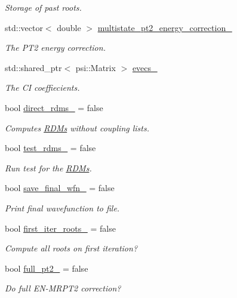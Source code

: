 \begin{DoxyCompactItemize}
\begin{DoxyCompactList}\small\item\em Storage of past roots. \end{DoxyCompactList}\item 
std\+::vector$<$ double $>$ \mbox{\hyperlink{classforte_1_1_excited_state_solver_a1f54bc7ffb16c953c37d5fcfeaa3fea2}{multistate\+\_\+pt2\+\_\+energy\+\_\+correction\+\_\+}}
\begin{DoxyCompactList}\small\item\em The P\+T2 energy correction. \end{DoxyCompactList}\item 
std\+::shared\+\_\+ptr$<$ psi\+::\+Matrix $>$ \mbox{\hyperlink{classforte_1_1_excited_state_solver_aab92da68a704a3dcc3da707aa04dded6}{evecs\+\_\+}}
\begin{DoxyCompactList}\small\item\em The CI coeffiecients. \end{DoxyCompactList}\item 
bool \mbox{\hyperlink{classforte_1_1_excited_state_solver_a958750ea8478270d12b38953633903f2}{direct\+\_\+rdms\+\_\+}} = false
\begin{DoxyCompactList}\small\item\em Computes \mbox{\hyperlink{classforte_1_1_r_d_ms}{R\+D\+Ms}} without coupling lists. \end{DoxyCompactList}\item 
bool \mbox{\hyperlink{classforte_1_1_excited_state_solver_ac5ec17f14aeabf5a2c249fe337c5f982}{test\+\_\+rdms\+\_\+}} = false
\begin{DoxyCompactList}\small\item\em Run test for the \mbox{\hyperlink{classforte_1_1_r_d_ms}{R\+D\+Ms}}. \end{DoxyCompactList}\item 
bool \mbox{\hyperlink{classforte_1_1_excited_state_solver_a40b5014e260497ddebc51a2bc3474a88}{save\+\_\+final\+\_\+wfn\+\_\+}} = false
\begin{DoxyCompactList}\small\item\em Print final wavefunction to file. \end{DoxyCompactList}\item 
bool \mbox{\hyperlink{classforte_1_1_excited_state_solver_a0533f1272e6a2418f4f8c3d798560b99}{first\+\_\+iter\+\_\+roots\+\_\+}} = false
\begin{DoxyCompactList}\small\item\em Compute all roots on first iteration? \end{DoxyCompactList}\item 
bool \mbox{\hyperlink{classforte_1_1_excited_state_solver_a0b359d79d59555aa1906cb0e5b6fc86a}{full\+\_\+pt2\+\_\+}} = false
\begin{DoxyCompactList}\small\item\em Do full E\+N-\/\+M\+R\+P\+T2 correction? \end{DoxyCompactList}\end{DoxyCompactItemize}


